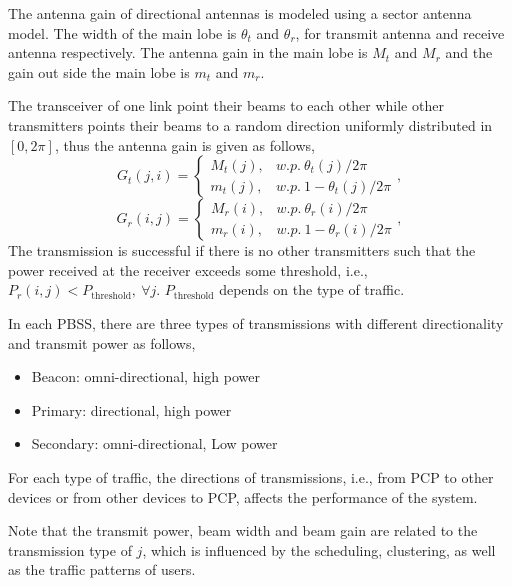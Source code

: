 \documentclass[10pt, conference, letterpaper]{IEEEtran}
\begin{document}
The antenna gain of directional antennas is modeled using a sector antenna model.%
The width of the main lobe is $\theta_t$ and $\theta_r$, for transmit antenna and receive antenna respectively. The antenna gain in the main lobe is $M_t$ and $M_r$ and the gain out side the main lobe is $m_t$ and $m_r$.

The transceiver of one link point their beams to each other while other transmitters points their beams to a random direction uniformly distributed in $[0, 2\pi]$, thus the antenna gain is given as follows,
\begin{equation*}
G_t(j,i) = 
\begin{cases}
M_t(j), & w.p. ~ \theta_t(j)/2\pi \\
m_t(j), & w.p. ~ 1-\theta_t(j)/2\pi
\end{cases},
\end{equation*}
\begin{equation*}
G_r(i,j) = 
\begin{cases}
M_r(i), & w.p. ~ \theta_r(i)/2\pi \\
m_r(i), & w.p. ~ 1-\theta_r(i)/2\pi
\end{cases},
\end{equation*}
The transmission is successful if there is no other transmitters such that the power received at the receiver exceeds some threshold, i.e., $P_r(i,j)< P_{\mathrm{threshold}}, ~ \forall j$. $P_{\mathrm{threshold}}$ depends on the type of traffic. 

In each PBSS, there are three types of transmissions with different directionality and transmit power as follows,
\begin{itemize}
	\item Beacon: omni-directional, high power
	\item Primary: directional, high power
	\item Secondary: omni-directional, Low power
\end{itemize}
For each type of traffic, the directions of transmissions, i.e., from PCP to other devices or from other devices to PCP, affects the performance of the system. 

Note that the transmit power, beam width and beam gain are related to the transmission type of $j$, which is influenced by the scheduling, clustering, as well as the traffic patterns of users.
\end{document}

